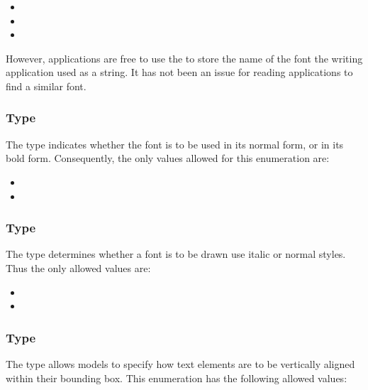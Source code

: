 \begin{itemize}
 \item {}
 \item {}
 \item {}
\end{itemize}

However, applications are free to use the \FontFamily to store the name of the font the writing application used as a string. It has not been an issue for reading applications to find a similar font. 

\subsubsection{Type \fixttspace{}}
The type \FontWeight indicates whether the font is to be used in its normal form, or in its bold form. Consequently, the only values allowed for this enumeration are: 

\begin{itemize}
 \item {} 
 \item {} 
\end{itemize}

\subsubsection{Type \fixttspace{}}

The type \FontStyle determines whether a font is to be
drawn use italic or normal styles. Thus the only allowed values are:

\begin{itemize}
 \item {} 
 \item {} 
\end{itemize}

\subsubsection{Type \fixttspace{}}

The type \VTextAnchor allows models to specify how text elements are to be
vertically aligned within their bounding box. This enumeration has the following allowed values: 

